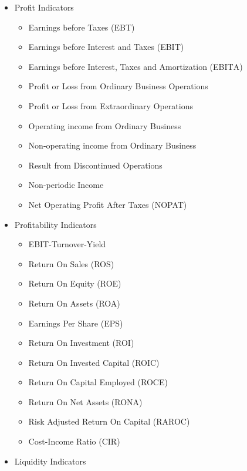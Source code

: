 \documentclass[]{book}
\providecommand{\tightlist}{%
  \setlength{\itemsep}{0pt}\setlength{\parskip}{0pt}}
\begin{document}
\begin{itemize}
\tightlist
\item
  Profit Indicators

  \begin{itemize}
  \tightlist
  \item
    Earnings before Taxes (EBT)
  \item
    Earnings before Interest and Taxes (EBIT)
  \item
    Earnings before Interest, Taxes and Amortization (ΕΒΙΤΑ)\\
  \item
    Profit or Loss from Ordinary Business Operations
  \item
    Profit or Loss from Extraordinary Operations
  \item
    Operating income from Ordinary Business\\
  \item
    Non-operating income from Ordinary Business
  \item
    Result from Discontinued Operations\\
  \item
    Non-periodic Income\\
  \item
    Net Operating Profit After Taxes (NOPAT)
  \end{itemize}
\item
  Profitability Indicators

  \begin{itemize}
  \tightlist
  \item
    EBIT-Turnover-Yield\\
  \item
    Return On Sales (ROS)\\
  \item
    Return On Equity (ROE)
  \item
    Return On Assets (ROA)
  \item
    Earnings Per Share (EPS)
  \item
    Return On Investment (ROI)
  \item
    Return On Invested Capital (ROIC)
  \item
    Return On Capital Employed (ROCE)
  \item
    Return On Net Assets (RONA)
  \item
    Risk Adjusted Return On Capital (RAROC)
  \item
    Cost-Income Ratio (CIR)
  \end{itemize}
\item
  Liquidity Indicators


\end{itemize}
\end{document}
